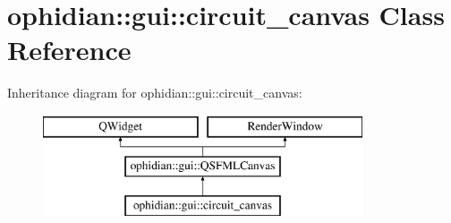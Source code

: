 \hypertarget{classophidian_1_1gui_1_1circuit__canvas}{\section{ophidian\-:\-:gui\-:\-:circuit\-\_\-canvas Class Reference}
\label{classophidian_1_1gui_1_1circuit__canvas}
}
Inheritance diagram for ophidian\-:\-:gui\-:\-:circuit\-\_\-canvas\-:\begin{figure}[H]
\begin{center}
\leavevmode
\includegraphics[height=3.000000cm]{classophidian_1_1gui_1_1circuit__canvas}
\end{center}
\end{figure}
